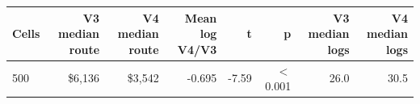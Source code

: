 \begin{tabular}{lrrrrrrr}
\toprule
Cells & V3 median route & V4 median route & Mean log V4/V3 & t & p & V3 median logs & V4 median logs \\
\midrule
500 & \$6,136 & \$3,542 & -0.695 & -7.59 & \ensuremath{<}0.001 & 26.0 & 30.5 \\
\bottomrule
\end{tabular}
